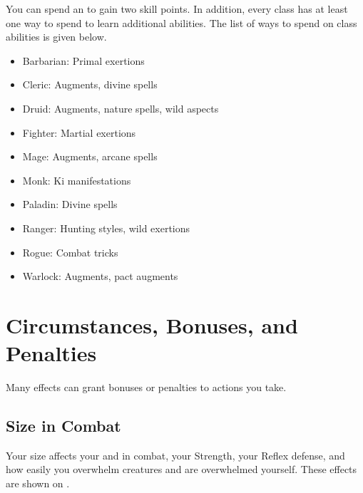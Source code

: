         You can spend an  to gain two skill points.
        In addition, every class has at least one way to spend  to learn additional abilities.
        The list of ways to spend  on class abilities is given below.
        \begin{itemize}
            \item Barbarian: Primal exertions
            \item Cleric: Augments, divine spells
            \item Druid: Augments, nature spells, wild aspects
            \item Fighter: Martial exertions
            \item Mage: Augments, arcane spells
            \item Monk: Ki manifestations
            \item Paladin: Divine spells
            \item Ranger: Hunting styles, wild exertions
            \item Rogue: Combat tricks
            \item Warlock: Augments, pact augments
        \end{itemize}

\section{Circumstances, Bonuses, and Penalties}

    Many effects can grant bonuses or penalties to actions you take.

    \subsection{Size in Combat}\label{Size in Combat}
        Your size affects your  and  in combat, your Strength, your Reflex defense, and how easily you overwhelm creatures and are overwhelmed yourself.
        These effects are shown on .

